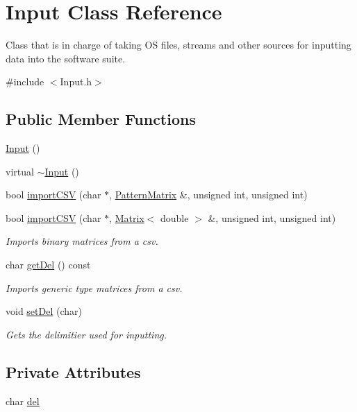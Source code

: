 \hypertarget{classInput}{}\section{Input Class Reference}
\label{classInput}


Class that is in charge of taking O\+S files, streams and other sources for inputting data into the software suite.  




{\ttfamily \#include $<$Input.\+h$>$}

\subsection*{Public Member Functions}
\begin{DoxyCompactItemize}
\item 
\hyperlink{classInput_abae3f379d3f157cf42dc857309832dba}{Input} ()
\item 
virtual \hyperlink{classInput_af2db35ba67c8a8ccd23bef6a482fc291}{$\sim$\+Input} ()
\item 
bool \hyperlink{classInput_ae2c34c38d697cdad30398d120e61579f}{import\+C\+S\+V} (char $\ast$, \hyperlink{classPatternMatrix}{Pattern\+Matrix} \&, unsigned int, unsigned int)
\item 
bool \hyperlink{classInput_a6d05f89d9f355f475974cf1bd92c9054}{import\+C\+S\+V} (char $\ast$, \hyperlink{singletonMatrix}{Matrix}$<$ double $>$ \&, unsigned int, unsigned int)
\begin{DoxyCompactList}\small\item\em Imports binary matrices from a csv. \end{DoxyCompactList}\item 
char \hyperlink{classInput_a361b89353087aa7f962a7bf748923239}{get\+Del} () const 
\begin{DoxyCompactList}\small\item\em Imports generic type matrices from a csv. \end{DoxyCompactList}\item 
void \hyperlink{classInput_a6303c6ebccb76588fb55a8bdb6b1f9ab}{set\+Del} (char)
\begin{DoxyCompactList}\small\item\em Gets the delimitier used for inputting. \end{DoxyCompactList}\end{DoxyCompactItemize}
\subsection*{Private Attributes}
\begin{DoxyCompactItemize}
\item 
char \hyperlink{classInput_aeecf320ec4c73b68165b8c19a6a3d28a}{del}
\end{DoxyCompactItemize}


